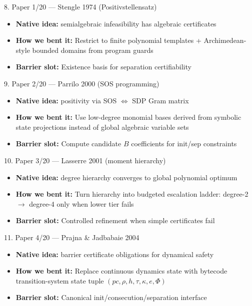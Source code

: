 \documentclass[aspectratio=169]{beamer}
\newcommand{\bendtag}[1]{\textcolor{blue!70!black}{\textbf{How we bent it:} #1}}
\newcommand{\slottag}[1]{\textcolor{teal!70!black}{\textbf{Barrier slot:} #1}}
\begin{document}
\begin{frame}[t,shrink=8]{8. Paper 1/20 — Stengle 1974 (Positivstellensatz)}
\begin{itemize}
  \item \textbf{Native idea:} semialgebraic infeasibility has algebraic certificates
  \item \bendtag{Restrict to finite polynomial templates + Archimedean-style bounded domains from program guards}
  \item \slottag{Existence basis for separation certifiability}
\end{itemize}
\end{frame}

\begin{frame}[t,shrink=8]{9. Paper 2/20 — Parrilo 2000 (SOS programming)}
\begin{itemize}
  \item \textbf{Native idea:} positivity via SOS \(\Leftrightarrow\) SDP Gram matrix
  \item \bendtag{Use low-degree monomial bases derived from symbolic state projections instead of global algebraic variable sets}
  \item \slottag{Compute candidate \(B\) coefficients for init/sep constraints}
\end{itemize}
\end{frame}

\begin{frame}[t,shrink=8]{10. Paper 3/20 — Lasserre 2001 (moment hierarchy)}
\begin{itemize}
  \item \textbf{Native idea:} degree hierarchy converges to global polynomial optimum
  \item \bendtag{Turn hierarchy into budgeted escalation ladder: degree-2 \(\rightarrow\) degree-4 only when lower tier fails}
  \item \slottag{Controlled refinement when simple certificates fail}
\end{itemize}
\end{frame}

\begin{frame}[t,shrink=8]{11. Paper 4/20 — Prajna \& Jadbabaie 2004}
\begin{itemize}
  \item \textbf{Native idea:} barrier certificate obligations for dynamical safety
  \item \bendtag{Replace continuous dynamics state with bytecode transition-system state tuple \((pc,\rho,h,\tau,\kappa,e,\Phi)\)}
  \item \slottag{Canonical init/consecution/separation interface}
\end{itemize}
\end{frame}
\end{document}
